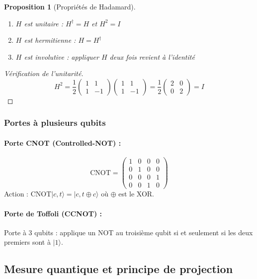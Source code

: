 \documentclass[12pt,a4paper]{article}
\newtheorem{proposition}[theorem]{Proposition}
\theoremstyle{definition}
\theoremstyle{remark}
\begin{document}
\begin{proposition}[Propriétés de Hadamard]
\begin{enumerate}
    \item $H$ est unitaire : $H^\dagger = H$ et $H^2 = I$
    \item $H$ est hermitienne : $H = H^\dagger$
    \item $H$ est involutive : appliquer $H$ deux fois revient à l'identité
\end{enumerate}
\end{proposition}

\begin{proof}[Vérification de l'unitarité]
\[
H^2 = \frac{1}{2} \begin{pmatrix} 1 & 1 \\ 1 & -1 \end{pmatrix} \begin{pmatrix} 1 & 1 \\ 1 & -1 \end{pmatrix} = \frac{1}{2} \begin{pmatrix} 2 & 0 \\ 0 & 2 \end{pmatrix} = I
\]
\end{proof}

\subsubsection{Portes à plusieurs qubits}

\paragraph{Porte CNOT (Controlled-NOT) :}
\[
\text{CNOT} = \begin{pmatrix}
1 & 0 & 0 & 0 \\
0 & 1 & 0 & 0 \\
0 & 0 & 0 & 1 \\
0 & 0 & 1 & 0
\end{pmatrix}
\]
Action : $\text{CNOT}|c,t\rangle = |c, t \oplus c\rangle$ où $\oplus$ est le XOR.

\paragraph{Porte de Toffoli (CCNOT) :}
Porte à 3 qubits : applique un NOT au troisième qubit si et seulement si les deux premiers sont à $|1\rangle$.

\subsection{Mesure quantique et principe de projection}
\end{document}

